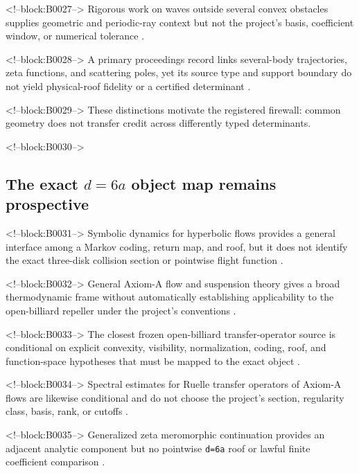 \documentclass[11pt,a4paper]{article}
\begin{document}
<!--block:B0027-->
Rigorous work on waves outside several convex obstacles supplies geometric and periodic-ray context but not the project's basis, coefficient window, or numerical tolerance
\citep{P30-S09}.

<!--block:B0028-->
A primary proceedings record links several-body trajectories, zeta functions, and scattering poles, yet its source type and support boundary do not yield physical-roof fidelity or a certified determinant
\citep{P30-S10}.

<!--block:B0029-->
These distinctions motivate the registered firewall: common geometry does not transfer credit across differently typed determinants.

<!--block:B0030-->
\subsection{\texorpdfstring{The exact \(d=6a\) object map remains prospective}{The exact d=6a object map remains prospective}}

<!--block:B0031-->
Symbolic dynamics for hyperbolic flows provides a general interface among a Markov coding, return map, and roof, but it does not identify the exact three-disk collision section or pointwise flight function
\citep{P30-S07}.

<!--block:B0032-->
General Axiom-A flow and suspension theory gives a broad thermodynamic frame without automatically establishing applicability to the open-billiard repeller under the project's conventions
\citep{P30-S08}.

<!--block:B0033-->
The closest frozen open-billiard transfer-operator source is conditional on explicit convexity, visibility, normalization, coding, roof, and function-space hypotheses that must be mapped to the exact object
\citep{P30-S11}.

<!--block:B0034-->
Spectral estimates for Ruelle transfer operators of Axiom-A flows are likewise conditional and do not choose the project's section, regularity class, basis, rank, or cutoffs
\citep{P30-S12}.

<!--block:B0035-->
Generalized zeta meromorphic continuation provides an adjacent analytic component but no pointwise \texttt{d=6a} roof or lawful finite coefficient comparison
\citep{P30-S15}.
\end{document}
